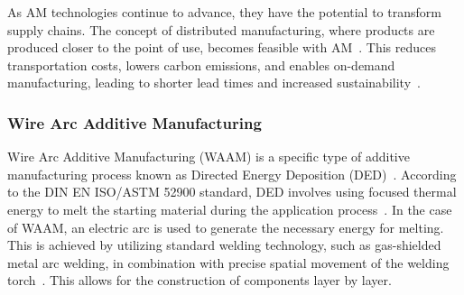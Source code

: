 As AM technologies continue to advance, they have the potential to transform supply chains. The concept of distributed manufacturing, where products are produced closer to the point of use, becomes feasible with AM~\cite{Jandyal.2022}. This reduces transportation costs, lowers carbon emissions, and enables on-demand manufacturing, leading to shorter lead times and increased sustainability~\cite{Haleem.2019}.




\subsubsection{Wire Arc Additive Manufacturing}
Wire Arc Additive Manufacturing (WAAM) is a specific type of additive manufacturing process known as Directed Energy Deposition (DED)~\cite{Svetlizky.2021}. According to the DIN EN ISO/ASTM 52900 standard, DED involves using focused thermal energy to melt the starting material during the application process~\cite{Additive}. In the case of WAAM, an electric arc is used to generate the necessary energy for melting. This is achieved by utilizing standard welding technology, such as gas-shielded metal arc welding, in combination with precise spatial movement of the welding torch~\cite{Cunningham.2018}. This allows for the construction of components layer by layer.

